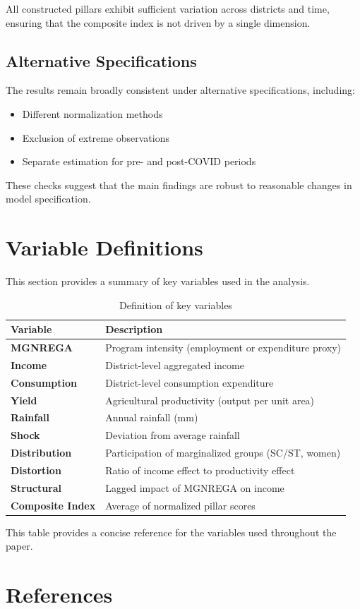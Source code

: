 \documentclass[12pt]{article}
\begin{document}
All constructed pillars exhibit sufficient variation across districts and time, ensuring that the composite index is not driven by a single dimension.

\subsection{Alternative Specifications}

The results remain broadly consistent under alternative specifications, including:

\begin{itemize}
\item Different normalization methods
\item Exclusion of extreme observations
\item Separate estimation for pre- and post-COVID periods
\end{itemize}

These checks suggest that the main findings are robust to reasonable changes in model specification.


\section{Variable Definitions}

This section provides a summary of key variables used in the analysis.

\begin{table}[H]
\centering
\setlength{\tabcolsep}{10pt}
\renewcommand{\arraystretch}{1.25}
\begin{tabularx}{\textwidth}{>{\raggedright\arraybackslash\bfseries}p{} >{\raggedright\arraybackslash}X}
\toprule
\rowcolor{black!8}
\textbf{Variable} & \textbf{Description} \\
\midrule
MGNREGA & Program intensity (employment or expenditure proxy) \\
Income & District-level aggregated income \\
Consumption & District-level consumption expenditure \\
Yield & Agricultural productivity (output per unit area) \\
Rainfall & Annual rainfall (mm) \\
Shock & Deviation from average rainfall \\
Distribution & Participation of marginalized groups (SC/ST, women) \\
Distortion & Ratio of income effect to productivity effect \\
Structural & Lagged impact of MGNREGA on income \\
Composite Index & Average of normalized pillar scores \\
\bottomrule
\end{tabularx}
\caption{Definition of key variables}
\end{table}

This table provides a concise reference for the variables used throughout the paper.



\newpage

\section{References}



\end{document}
